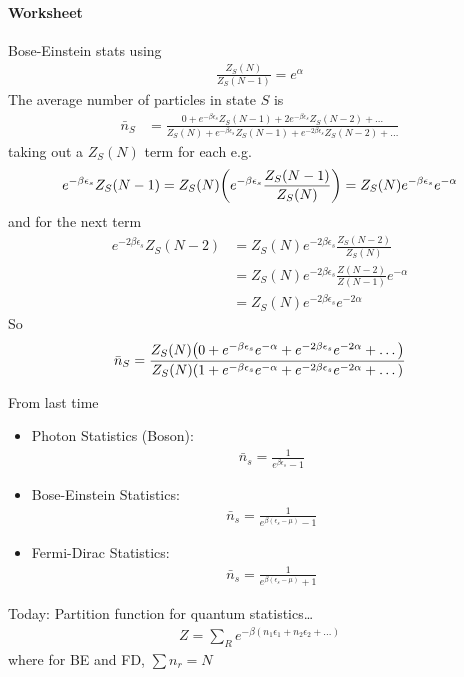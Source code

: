 \documentclass[../main.tex]{subfiles}
\begin{document}
\paragraph{Worksheet} Bose-Einstein stats using
\begin{align*}
    \frac{Z_S(N)}{Z_S(N-1)} = e^{\alpha}
\end{align*}
The average number of particles in state $S$ is
\begin{align*}
    \bar n_S &= \frac{
        0 + e^{-\beta \epsilon_s} Z_S (N - 1) + 2 e^{-\beta \epsilon_s} Z_S (N - 2) + \dots
    }
    {
        Z_S (N) + e^{-\beta \epsilon_s} Z_S (N - 1) + e^{-2\beta \epsilon_s} Z_S (N - 2) + \dots
    }
\end{align*}
taking out a $Z_S (N)$ term for each e.g.
\begin{align*}
    e^{-\beta \epsilon_s} Z_S (N - 1) = Z_S(N) \qt(e^{-\beta \epsilon_s} \frac{Z_S(N - 1)}{Z_S(N)}) = Z_S(N) e^{-\beta \epsilon_s}e^{-\alpha}
\end{align*}
and for the next term
\begin{align*}
    e^{-2\beta \epsilon_s} Z_S (N - 2) &= Z_S(N) e^{-2\beta \epsilon_s} \frac{Z_S(N - 2)}{Z_S(N)} \\
    &= Z_S(N) e^{-2\beta \epsilon_s} \frac{Z(N - 2)}{Z(N - 1)} e^{-\alpha} \\
    &= Z_S(N) e^{-2\beta \epsilon_s} e^{-2\alpha}
\end{align*}
So
\begin{align*}
    \bar n_S = \frac{
        Z_S(N) \qt(
            0 + e^{-\beta \epsilon_s} e^{-\alpha} + e^{-2\beta \epsilon_s} e^{-2\alpha} + \dots
        )
    }
    {
        Z_S(N) \qt(
            1 + e^{-\beta \epsilon_s} e^{-\alpha} + e^{-2\beta \epsilon_s} e^{-2\alpha} + \dots
        )
    }
\end{align*}

\newpage
{}
From last time
\begin{itemize}
    \item Photon Statistics (Boson):
    \begin{align*}
        \bar n_s = \frac{1}{e^{\beta \epsilon_s} - 1}
    \end{align*}
    \item Bose-Einstein Statistics:
    \begin{align*}
        \bar n_s = \frac{1}{e^{\beta (\epsilon_s - \mu)} - 1}
    \end{align*}
    \item Fermi-Dirac Statistics: 
    \begin{align*}
        \bar n_s = \frac{1}{e^{\beta (\epsilon_s - \mu)} + 1}
    \end{align*}
\end{itemize}
Today: Partition function for quantum statistics\dots
\begin{align*}
    Z = \sum_R e^{-\beta (n_1 \epsilon_1 + n_2 \epsilon_2 + \dots)}
\end{align*}
where for BE and FD, $\sum n_r = N$
\end{document}

